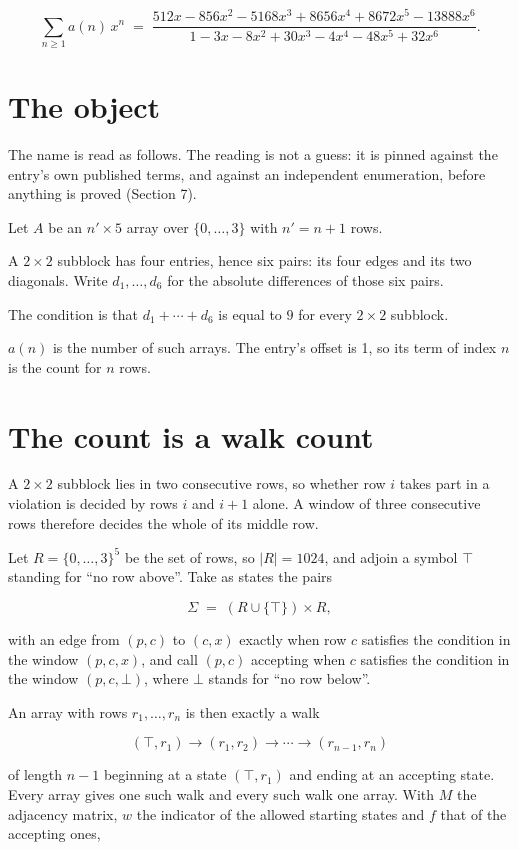 \documentclass[11pt]{article}
\theoremstyle{definition}
\begin{document}
\[\sum_{n \ge 1} a(n)\,x^n \;=\; \frac{512x - 856x^{2} - 5168x^{3} + 8656x^{4} + 8672x^{5} - 13888x^{6}}{1 - 3x - 8x^{2} + 30x^{3} - 4x^{4} - 48x^{5} + 32x^{6}}.\]

\section{The object}

The name is read as follows. The reading is not a guess: it is pinned against the entry's own published terms, and against an independent enumeration, before anything is proved (Section 7).

Let $A$ be an $n' \times 5$ array over $\{0,\dots,3\}$ with $n' = n + 1$ rows.

A $2\times2$ subblock has four entries, hence six pairs: its four edges and its two diagonals. Write $d_1,\dots,d_6$ for the absolute differences of those six pairs.

The condition is that $d_1+\cdots+d_6$ is equal to $9$ for every $2\times2$ subblock.

$a(n)$ is the number of such arrays. The entry's offset is 1, so its term of index $n$ is the count for $n$ rows.

\section{The count is a walk count}

A $2\times2$ subblock lies in two consecutive rows, so whether row $i$ takes part in a violation is decided by rows $i$ and $i+1$ alone. A window of three consecutive rows therefore decides the whole of its middle row.

Let $R = \{0,\dots,3\}^{5}$ be the set of rows, so $|R| = 1024$, and adjoin a symbol $\top$ standing for ``no row above''. Take as states the pairs

\[\Sigma \;=\; (R \cup \{\top\}) \times R,\]

with an edge from $(p,c)$ to $(c,x)$ exactly when row $c$ satisfies the condition in the window $(p,c,x)$, and call $(p,c)$ accepting when $c$ satisfies the condition in the window $(p,c,\bot)$, where $\bot$ stands for ``no row below''.

An array with rows $r_1,\dots,r_n$ is then exactly a walk

\[(\top,r_1) \to (r_1,r_2) \to \cdots \to (r_{n-1},r_n)\]

of length $n-1$ beginning at a state $(\top,r_1)$ and ending at an accepting state. Every array gives one such walk and every such walk one array. With $M$ the adjacency matrix, $w$ the indicator of the allowed starting states and $f$ that of the accepting ones,
\end{document}
